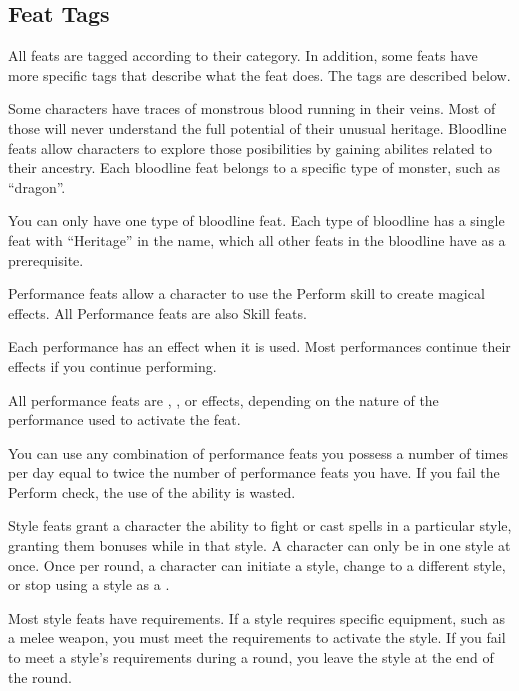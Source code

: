     \subsection{Feat Tags}

        All feats are tagged according to their category.
        In addition, some feats have more specific tags that describe what the feat does.
        The tags are described below.


        Some characters have traces of monstrous blood running in their veins.
        Most of those will never understand the full potential of their unusual heritage.
        Bloodline feats allow characters to explore those posibilities by gaining abilites related to their ancestry.
        Each bloodline feat belongs to a specific type of monster, such as ``dragon''.

        You can only have one type of bloodline feat.
        Each type of bloodline has a single feat with ``Heritage'' in the name, which all other feats in the bloodline have as a prerequisite.

        \label{Performance Feats}
        Performance feats allow a character to use the Perform skill to create magical effects.
        All Performance feats are also Skill feats.

        Each performance has an effect when it is used.
        Most performances continue their effects if you continue performing.

        All performance feats are , , or  effects, depending on the nature of the performance used to activate the feat.

        You can use any combination of performance feats you possess a number of times per day equal to twice the number of performance feats you have.
        If you fail the Perform check, the use of the ability is wasted.

        \label{Style Feats}
        Style feats grant a character the ability to fight or cast spells in a particular style, granting them bonuses while in that style.
        A character can only be in one style at once.
        Once per round, a character can initiate a style, change to a different style, or stop using a style as a .

        Most style feats have requirements.
        If a style requires specific equipment, such as a melee weapon, you must meet the requirements to activate the style.
        If you fail to meet a style's requirements during a round, you leave the style at the end of the round.

